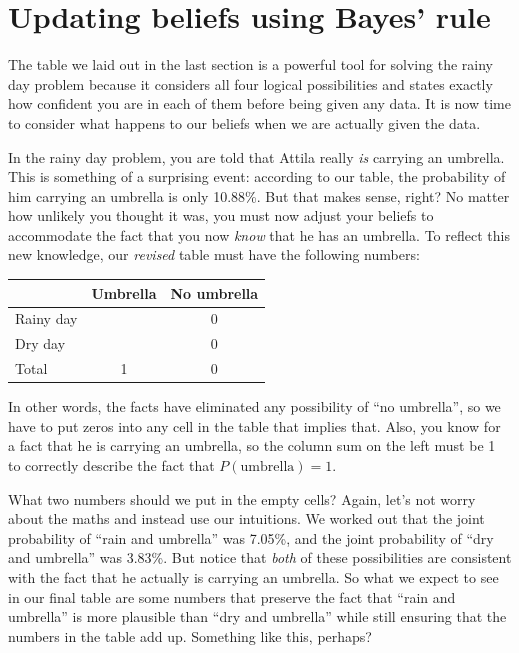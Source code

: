 \documentclass[
  11pt,
  a4paper,
  twoside,symmetric,openright]{book}
\theoremstyle{break}
\theoremstyle{break}
\begin{document}
\section{Updating beliefs using Bayes' rule}\label{updating-beliefs-using-bayes-rule}

The table we laid out in the last section is a powerful tool for solving the rainy day problem because it considers all four logical possibilities and states exactly how confident you are in each of them before being given any data. It is now time to consider what happens to our beliefs when we are actually given the data.

In the rainy day problem, you are told that Attila really \emph{is} carrying an umbrella. This is something of a surprising event: according to our table, the probability of him carrying an umbrella is only 10.88\%. But that makes sense, right? No matter how unlikely you thought it was, you must now adjust your beliefs to accommodate the fact that you now \emph{know} that he has an umbrella. To reflect this new knowledge, our \emph{revised} table must have the following numbers:

\begin{longtable}[]{@{}lcc@{}}
\toprule\noalign{}
& Umbrella & No umbrella \\
\midrule\noalign{}
\endhead
\bottomrule\noalign{}
\endlastfoot
Rainy day & & 0 \\
Dry day & & 0 \\
Total & 1 & 0 \\
\end{longtable}

In other words, the facts have eliminated any possibility of ``no umbrella'', so we have to put zeros into any cell in the table that implies that. Also, you know for a fact that he is carrying an umbrella, so the column sum on the left must be 1 to correctly describe the fact that \(P(\mbox{umbrella})=1\).

What two numbers should we put in the empty cells? Again, let's not worry about the maths and instead use our intuitions. We worked out that the joint probability of ``rain and umbrella'' was 7.05\%, and the joint probability of ``dry and umbrella'' was 3.83\%. But notice that \emph{both} of these possibilities are consistent with the fact that he actually is carrying an umbrella. So what we expect to see in our final table are some numbers that preserve the fact that ``rain and umbrella'' is more plausible than ``dry and umbrella'' while still ensuring that the numbers in the table add up. Something like this, perhaps?
\end{document}
